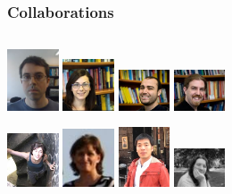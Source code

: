 \documentclass{beamer}
\begin{document}
\begin{frame}
  \frametitle{Collaborations}
  \begin{columns}[t]
      \begin{center}
        \includegraphics[width=0.6in]{figures/boris}
        \includegraphics[width=0.6in]{figures/cristina}
        \includegraphics[width=0.6in]{figures/alessandro}
        \includegraphics[width=0.6in]{figures/ken}

        \includegraphics[width=0.6in]{figures/azadeh}
        \includegraphics[width=0.6in]{figures/nuria}
        \includegraphics[width=0.6in]{figures/ray}
        \includegraphics[width=0.6in]{figures/david}
        

\end{center}
\end{columns}
\end{frame}
\end{document}
